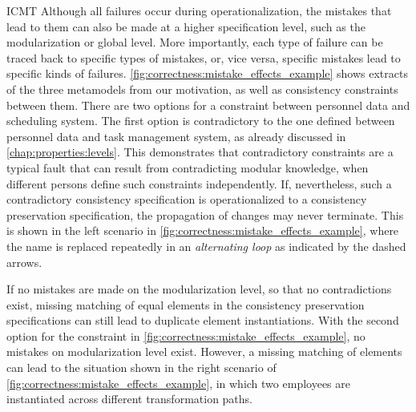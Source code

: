 \begin{copiedFrom}{ICMT}
Although all failures occur during operationalization, the mistakes that lead to them can also be made at a higher specification level, such as the modularization or global level.
More importantly, each type of failure can be traced back to specific types of mistakes, or, vice versa, specific mistakes lead to specific kinds of failures.
\autoref{fig:correctness:mistake_effects_example} shows extracts of the three metamodels from our motivation, as well as consistency constraints between them.
There are two options for a constraint between personnel data and scheduling system.
The first option is contradictory to the one defined between personnel data and task management system, as already discussed in \autoref{chap:properties:levels}.
This demonstrates that contradictory constraints are a typical fault that can result from contradicting modular knowledge, when different persons define such constraints independently.
If, nevertheless, such a contradictory consistency specification is operationalized to a consistency preservation specification, the propagation of changes may never terminate.
This is shown in the left scenario in \autoref{fig:correctness:mistake_effects_example}, where
the name is replaced repeatedly in an \emph{alternating loop} as indicated by the dashed arrows.

If no mistakes are made on the modularization level, so that no contradictions exist, %
missing matching of equal elements in the consistency preservation specifications can still lead to duplicate element instantiations.
With the second option for the constraint in \autoref{fig:correctness:mistake_effects_example}, %
no mistakes on modularization level exist.
However, a missing matching of elements %
can lead to the situation shown in the right scenario of \autoref{fig:correctness:mistake_effects_example}, in which two employees are instantiated across different transformation paths.


\end{copiedFrom}
